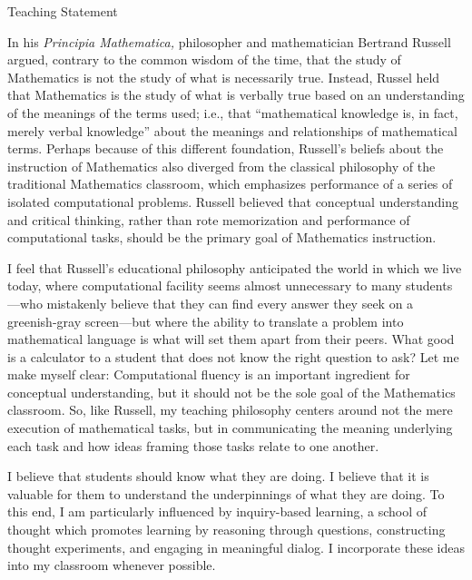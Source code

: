 \documentclass[11pt]{article}
\begin{document}

\begin{center}
\huge Teaching Statement
\end{center}

\vfill

In his \emph{Principia Mathematica,} philosopher and mathematician Bertrand Russell argued, contrary to the common wisdom of the time, that the study of Mathematics is not the study of what is necessarily true. Instead, Russel held that Mathematics is the study of what is verbally true based on an understanding of the meanings of the terms used; i.e., that ``mathematical knowledge is, in fact, merely verbal knowledge'' about the meanings and relationships of mathematical terms. Perhaps because of this different foundation, Russell's beliefs about the instruction of Mathematics also diverged from the classical philosophy of the traditional Mathematics classroom, which emphasizes performance of a series of isolated computational problems. Russell believed that conceptual understanding and critical thinking, rather than rote memorization and performance of computational tasks, should be the primary goal of Mathematics instruction.

I feel that Russell's educational philosophy anticipated the world in which we live today, where computational facility seems almost unnecessary to many students---who mistakenly believe that they can find every answer they seek on a greenish-gray screen---but where the ability to translate a problem into mathematical language is what will set them apart from their peers. What good is a calculator to a student that does not know the right question to ask? Let me make myself clear: Computational fluency is an important ingredient for conceptual understanding, but it should not be the sole goal of the Mathematics classroom. So, like Russell, my teaching philosophy centers around not the mere execution of mathematical tasks, but in communicating the meaning underlying each task and how ideas framing those tasks relate to one another.

I believe that students should know what they are doing. I believe that it is valuable for them to understand the underpinnings of what they are doing. To this end, I am particularly influenced by inquiry-based learning, a school of thought which promotes learning by reasoning through questions, constructing thought experiments, and engaging in meaningful dialog. I incorporate these ideas into my classroom whenever possible.
\end{document}
